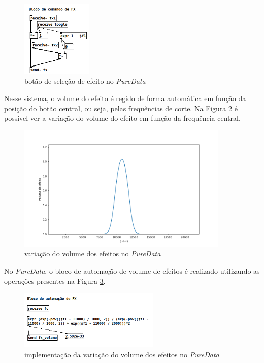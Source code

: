     \begin{figure}[h]
        \centering
        \includegraphics[width=0.3\textwidth]{figuras/fig48.png}
        \caption{botão de seleção de efeito no \textit{PureData}}
        \label{fig48}
    \end{figure}

    Nesse sistema, o volume do efeito é regido de forma automática em função da posição do botão central, ou seja, pelas frequências de corte. Na Figura \ref{fig49} é possível ver a variação do volume do efeito em função da frequência central.

    \begin{figure}[h]
        \centering
        \includegraphics[width=0.9\textwidth]{figuras/fig49.png}
        \caption{variação do volume dos efeitos no \textit{PureData}}
        \label{fig49}
    \end{figure}

    No \textit{PureData}, o bloco de automação de volume de efeitos é realizado utilizando as operações presentes na Figura \ref{fig50}.

    \begin{figure}[h]
        \centering
        \includegraphics[width=0.6\textwidth]{figuras/fig50.png}
        \caption{implementação da variação do volume dos efeitos no \textit{PureData}}
        \label{fig50}
    \end{figure}

